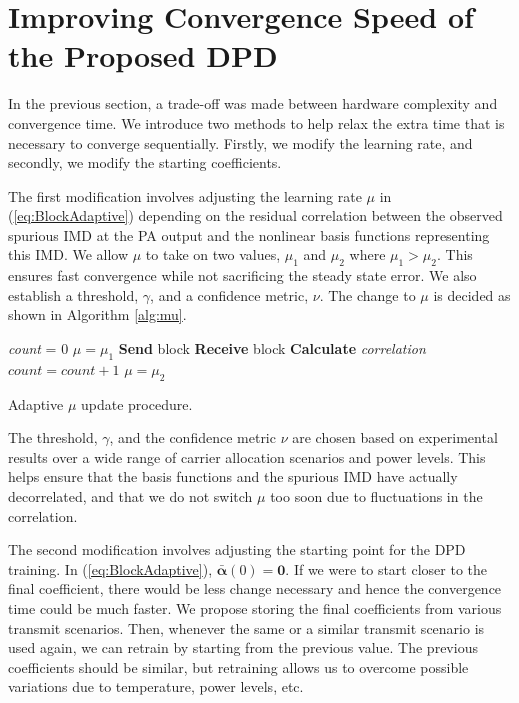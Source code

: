 \section{Improving Convergence Speed of the Proposed DPD}
\label{sec:ConvergenceSpeed}
In the previous section, a trade-off was made between hardware complexity and convergence time. We introduce two methods to help relax the extra time that is necessary to converge sequentially. 
Firstly, we modify the learning rate, and secondly, we modify the starting coefficients.

The first modification involves adjusting the learning rate $\mu$ in (\ref{eq:BlockAdaptive}) depending on the residual correlation between the observed spurious IMD at the PA output and the nonlinear basis functions representing this IMD.
 We allow $\mu$ to take on two values, $\mu_1$ and $\mu_2$ where $\mu_1 > \mu_2$. 
 This ensures fast convergence while not sacrificing the steady state error. 
 We also establish a threshold, $\gamma$, and a confidence metric, $\nu$. 
 The change to $\mu$ is decided as shown in Algorithm \ref{alg:mu}.
\begin{algorithm}[h]
\SetAlgoLined
\textit{count} = 0\;
$\mu = \mu_1$\;
 {
  \textbf{Send} block\;
  \textbf{Receive} block\;
  \textbf{Calculate} \textit{correlation}\;
  {
   $count = count + 1$\; 
  }
  {
   $\mu = \mu_2$\; 
  }
 }
\caption{Adaptive $\mu$ update procedure.}
\label{alg:mu}
\end{algorithm}
The threshold, $\gamma$, and the confidence metric $\nu$ are chosen based on experimental results over a wide range of carrier allocation scenarios and power levels. 
This helps ensure that the basis functions and the spurious IMD have actually decorrelated, and that we do not switch $\mu$ too soon due to fluctuations in the correlation.

The second modification involves adjusting the starting point for the DPD training. 
In (\ref{eq:BlockAdaptive}), $\bar{\boldsymbol{\alpha}}(0) = \mathbf{0}$. 
If we were to start closer to the final coefficient, there would be less change necessary and hence the convergence time could be much faster. 
We propose storing the final coefficients from various transmit scenarios. 
Then, whenever the same or a similar transmit scenario is used again, we can retrain by starting from the previous value. 
The previous coefficients should be similar, but retraining allows us to overcome possible variations due to temperature, power levels, etc. 

